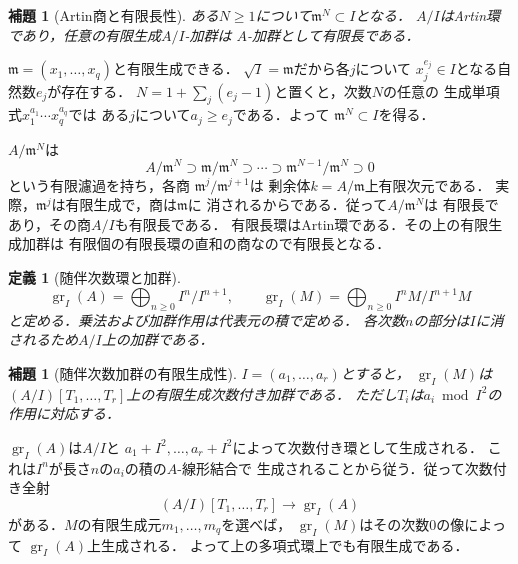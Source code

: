 \documentclass[a5paper,10pt,onecolumn]{jsarticle}
\makeatletter
\theoremstyle{mathnotetheorem}
\newtheorem{definition}[theorem]{定義}
\newtheorem{lemma}[theorem]{補題}
\renewcommand{\proofname}{証明}
\renewenvironment{proof}[1][\proofname]{%
  \par\pushQED{\qed}\normalfont\topsep4\p@\@plus2\p@\relax
  \trivlist\item[\hskip\labelsep\bfseries #1]\ignorespaces
}{\popQED\endtrivlist\@endpefalse}
\makeatother
\begin{document}
\begin{lemma}[Artin商と有限長性]\label{hsam:lem:artin}
ある$N\ge1$について$\mathfrak m^N\subset I$となる．
$A/I$はArtin環であり，任意の有限生成$A/I$-加群は
$A$-加群として有限長である．
\end{lemma}
\begin{proof}
$\mathfrak m=(x_1,\ldots,x_q)$と有限生成できる．
$\sqrt I=\mathfrak m$だから各$j$について
$x_j^{e_j}\in I$となる自然数$e_j$が存在する．
$N=1+\sum_j(e_j-1)$と置くと，次数$N$の任意の
生成単項式$x_1^{a_1}\cdots x_q^{a_q}$では
ある$j$について$a_j\ge e_j$である．よって
$\mathfrak m^N\subset I$を得る．

$A/\mathfrak m^N$は
\[
 A/\mathfrak m^N\supset\mathfrak m/\mathfrak m^N
 \supset\cdots\supset\mathfrak m^{N-1}/\mathfrak m^N
 \supset0
\]
という有限濾過を持ち，各商
$\mathfrak m^j/\mathfrak m^{j+1}$は
剰余体$k=A/\mathfrak m$上有限次元である．
実際，$\mathfrak m^j$は有限生成で，商は$\mathfrak m$に
消されるからである．従って$A/\mathfrak m^N$は
有限長であり，その商$A/I$も有限長である．
有限長環はArtin環である．その上の有限生成加群は
有限個の有限長環の直和の商なので有限長となる．
\end{proof}

\begin{definition}[随伴次数環と加群]
\[
 \operatorname{gr}_I(A)=\bigoplus_{n\ge0}I^n/I^{n+1},
 \qquad
 \operatorname{gr}_I(M)=\bigoplus_{n\ge0}I^nM/I^{n+1}M
\]
と定める．乗法および加群作用は代表元の積で定める．
各次数$n$の部分は$I$に消されるため$A/I$上の加群である．
\end{definition}

\begin{lemma}[随伴次数加群の有限生成性]\label{hsam:lem:gr}
$I=(a_1,\ldots,a_r)$とすると，
$\operatorname{gr}_I(M)$は
$(A/I)[T_1,\ldots,T_r]$上の有限生成次数付き加群である．
ただし$T_i$は$a_i\bmod I^2$の作用に対応する．
\end{lemma}
\begin{proof}
$\operatorname{gr}_I(A)$は$A/I$と
$a_1+I^2,\ldots,a_r+I^2$によって次数付き環として生成される．
これは$I^n$が長さ$n$の$a_i$の積の$A$-線形結合で
生成されることから従う．従って次数付き全射
\[
 (A/I)[T_1,\ldots,T_r]\longrightarrow
 \operatorname{gr}_I(A)
\]
がある．$M$の有限生成元$m_1,\ldots,m_q$を選べば，
$\operatorname{gr}_I(M)$はその次数0の像によって
$\operatorname{gr}_I(A)$上生成される．
よって上の多項式環上でも有限生成である．
\end{proof}
\end{document}

